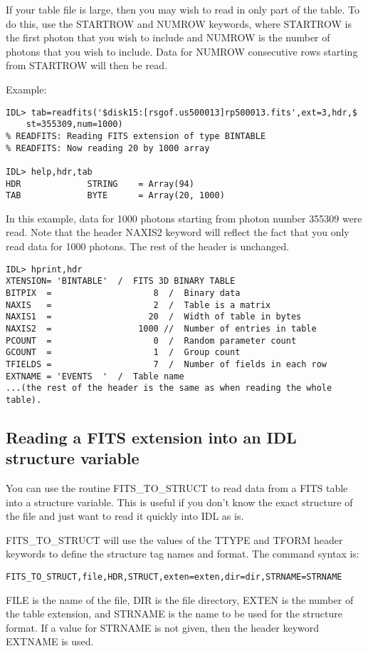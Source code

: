 If your table file is large, then you may wish to read in only part of the
table. To do this, use the STARTROW and NUMROW keywords, where STARTROW is the
first photon that you wish to include and NUMROW is the number of photons that
you wish to include. Data for NUMROW consecutive rows starting from STARTROW
will then be read.
 
Example:

\medskip\noindent
\begin{verbatim}
IDL> tab=readfits('$disk15:[rsgof.us500013]rp500013.fits',ext=3,hdr,$
	st=355309,num=1000)
% READFITS: Reading FITS extension of type BINTABLE
% READFITS: Now reading 20 by 1000 array
 
IDL> help,hdr,tab
HDR             STRING    = Array(94)
TAB             BYTE      = Array(20, 1000)
\end{verbatim}
In this example, data for 1000 photons starting from photon number 355309 were
read. Note that the header NAXIS2 keyword will reflect the fact that you only
read data for 1000 photons. The rest of the header is unchanged.

\medskip\noindent
\begin{verbatim}
IDL> hprint,hdr
XTENSION= 'BINTABLE'  /  FITS 3D BINARY TABLE
BITPIX  =                    8  /  Binary data
NAXIS   =                    2  /  Table is a matrix
NAXIS1  =                   20  /  Width of table in bytes
NAXIS2  =                 1000 //  Number of entries in table
PCOUNT  =                    0  /  Random parameter count
GCOUNT  =                    1  /  Group count
TFIELDS =                    7  /  Number of fields in each row
EXTNAME = 'EVENTS  '  /  Table name
...(the rest of the header is the same as when reading the whole table).
\end{verbatim}
 

\subsection{Reading a FITS extension into an IDL structure variable}
 
You can use the routine FITS{\_}TO{\_}STRUCT to read data from a FITS table into a
structure variable. This is useful if you don't know the exact structure of the
file and just want to read it quickly into IDL as is.
 
FITS{\_}TO{\_}STRUCT will use the values of the TTYPE and TFORM header keywords to
define the structure tag names and format. The command syntax is:

\medskip\noindent
\begin{verbatim}
FITS_TO_STRUCT,file,HDR,STRUCT,exten=exten,dir=dir,STRNAME=STRNAME
\end{verbatim}
FILE is the name of the file, DIR is the file directory, EXTEN is the number of
the table extension, and STRNAME is the name to be used for the structure
format. If a value for STRNAME is not given, then the header keyword EXTNAME is
used.

